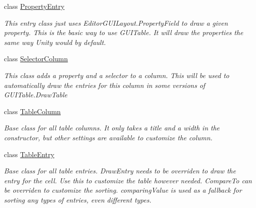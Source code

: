 \begin{DoxyCompactItemize}
class \mbox{\hyperlink{class_g_u_i_extensions_1_1_property_entry}{Property\+Entry}}
\begin{DoxyCompactList}\small\item\em This entry class just uses Editor\+G\+U\+I\+Layout.\+Property\+Field to draw a given property. This is the basic way to use G\+U\+I\+Table. It will draw the properties the same way Unity would by default. \end{DoxyCompactList}\item 
class \mbox{\hyperlink{class_g_u_i_extensions_1_1_selector_column}{Selector\+Column}}
\begin{DoxyCompactList}\small\item\em This class adds a property and a selector to a column. This will be used to automatically draw the entries for this column in some versions of G\+U\+I\+Table.\+Draw\+Table \end{DoxyCompactList}\item 
class \mbox{\hyperlink{class_g_u_i_extensions_1_1_table_column}{Table\+Column}}
\begin{DoxyCompactList}\small\item\em Base class for all table columns. It only takes a title and a width in the constructor, but other settings are available to customize the column. \end{DoxyCompactList}\item 
class \mbox{\hyperlink{class_g_u_i_extensions_1_1_table_entry}{Table\+Entry}}
\begin{DoxyCompactList}\small\item\em Base class for all table entries. Draw\+Entry needs to be overriden to draw the entry for the cell. Use this to customize the table however needed. Compare\+To can be overriden to customize the sorting. comparing\+Value is used as a fallback for sorting any types of entries, even different types. \end{DoxyCompactList}\end{DoxyCompactItemize}
